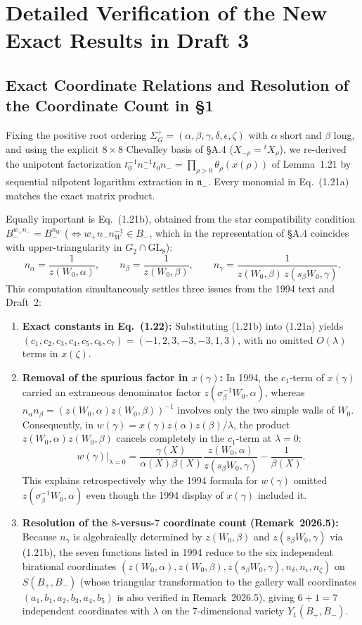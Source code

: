 \documentclass[11pt,letterpaper]{article}
\begin{document}
\section{Detailed Verification of the New Exact Results in Draft 3}

\subsection{Exact Coordinate Relations and Resolution of the Coordinate Count in \S1}

Fixing the positive root ordering $\Sigma_G^+ = (\alpha,\beta,\gamma,\delta,\epsilon,\zeta)$ with $\alpha$ short and $\beta$ long, and using the explicit $8\times 8$ Chevalley basis of \S A.4 ($X_{-\rho}={}^t X_\rho$), we re-derived the unipotent factorization $t_0^{-1}n_-^{-1}t_0 n_- = \prod_{\rho>0}\theta_\rho(x(\rho))$ of Lemma~1.21 by sequential nilpotent logarithm extraction in $\mathfrak{n}_-$. Every monomial in Eq.~(1.21a) matches the exact matrix product.

Equally important is Eq.~(1.21b), obtained from the star compatibility condition $B_-^{w_+ n_-} = B_-^{n_W}$ ($\Longleftrightarrow w_+ n_- n_W^{-1}\in B_-$, which in the representation of \S A.4 coincides with upper-triangularity in $G_2\cap \mathrm{GL}_8$):
\[
n_\alpha = \frac{1}{z(W_0,\alpha)}, \qquad
n_\beta = \frac{1}{z(W_0,\beta)}, \qquad
n_\gamma = \frac{1}{z(W_0,\beta)\,z(s_\beta W_0,\gamma)}.
\]
This computation simultaneously settles three issues from the 1994 text and Draft~2:
\begin{enumerate}[(1)]
\item \textbf{Exact constants in Eq.~(1.22):} Substituting (1.21b) into (1.21a) yields $(c_1,c_2,c_3,c_4,c_5,c_6,c_7) = (-1,2,3,-3,-3,1,3)$, with no omitted $O(\lambda)$ terms in $x(\zeta)$.
\item \textbf{Removal of the spurious factor in $x(\gamma)$:} In 1994, the $c_1$-term of $x(\gamma)$ carried an extraneous denominator factor $z(\sigma_\beta^{-1}W_0,\alpha)$, whereas $n_\alpha n_\beta = (z(W_0,\alpha)z(W_0,\beta))^{-1}$ involves only the two simple walls of $W_0$. Consequently, in $w(\gamma) = x(\gamma)z(\alpha)z(\beta)/\lambda$, the product $z(W_0,\alpha)z(W_0,\beta)$ cancels completely in the $c_1$-term at $\lambda=0$:
\[
w(\gamma)\big|_{\lambda=0} = \frac{\gamma(X)}{\alpha(X)\beta(X)}\frac{z(W_0,\alpha)}{z(s_\beta W_0,\gamma)} - \frac{1}{\beta(X)}.
\]
This explains retrospectively why the 1994 formula for $w(\gamma)$ omitted $z(\sigma_\beta^{-1}W_0,\alpha)$ even though the 1994 display of $x(\gamma)$ included it.
\item \textbf{Resolution of the $8$-versus-$7$ coordinate count (Remark~2026.5):} Because $n_\gamma$ is algebraically determined by $z(W_0,\beta)$ and $z(s_\beta W_0,\gamma)$ via (1.21b), the seven functions listed in 1994 reduce to the six independent birational coordinates $(z(W_0,\alpha),z(W_0,\beta),z(s_\beta W_0,\gamma),n_\delta,n_\epsilon,n_\zeta)$ on $S(B_+,B_-)$ (whose triangular transformation to the gallery wall coordinates $(a_1,b_1,a_2,b_3,a_4,b_5)$ is also verified in Remark~2026.5), giving $6+1=7$ independent coordinates with $\lambda$ on the $7$-dimensional variety $Y_1(B_+,B_-)$.
\end{enumerate}
\end{document}
